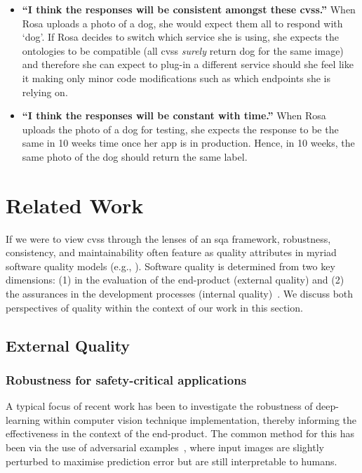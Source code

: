 \begin{itemize}
  \item \textbf{``I think the responses will be consistent amongst these \glspl{cvs}.''} When Rosa uploads a photo of a dog, she would expect them all to respond with `dog'. If Rosa decides to switch which service she is using, she expects the ontologies to be compatible (all \glspl{cvs} \textit{surely} return dog for the same image) and therefore she can expect to plug-in a different service should she feel like it making only minor code modifications such as which endpoints she is relying on.
  \item \textbf{``I think the responses will be constant with time.''} When Rosa uploads the photo of a dog for testing, she expects the response to be the same in 10 weeks time once her app is in production. Hence, in 10 weeks, the same photo of the dog should return the same label.
\end{itemize}

\section{Related Work}
\label{icsme2019:sec:related-work}

If we were to view \glspl{cvs} through the lenses of an \gls{sqa} framework, robustness, consistency, and maintainability often feature as quality attributes in myriad software quality models (e.g., \citep{ISO9126:1999}). Software quality is determined from two key dimensions: (1) in the evaluation of the end-product (external quality) and (2) the assurances in the development processes (internal quality)~\citep{Pressman:2005vf}.  We discuss both perspectives of quality within the context of our work in this section.

\subsection{External Quality}

\subsubsection{Robustness for safety-critical applications}
A typical focus of recent work has been to investigate the robustness of deep-learning within computer vision technique implementation, thereby informing the effectiveness in the context of the end-product. The common method for this has been via the use of adversarial examples~\citep{Szegedy:2013vw}, where input images are slightly perturbed to maximise prediction error but are still interpretable to humans.

